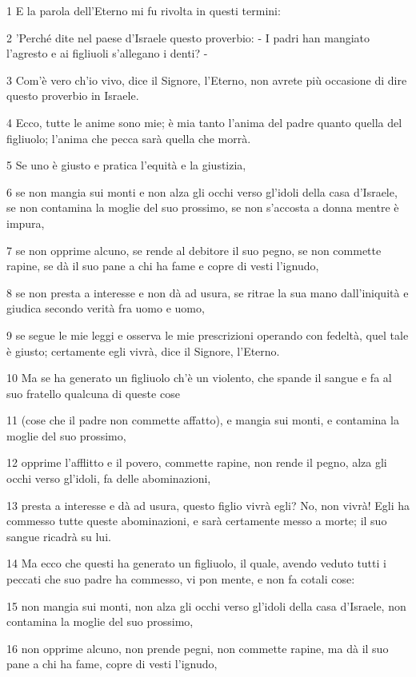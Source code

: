 \par 1 E la parola dell'Eterno mi fu rivolta in questi termini:
\par 2 'Perché dite nel paese d'Israele questo proverbio: - I padri han mangiato l'agresto e ai figliuoli s'allegano i denti? -
\par 3 Com'è vero ch'io vivo, dice il Signore, l'Eterno, non avrete più occasione di dire questo proverbio in Israele.
\par 4 Ecco, tutte le anime sono mie; è mia tanto l'anima del padre quanto quella del figliuolo; l'anima che pecca sarà quella che morrà.
\par 5 Se uno è giusto e pratica l'equità e la giustizia,
\par 6 se non mangia sui monti e non alza gli occhi verso gl'idoli della casa d'Israele, se non contamina la moglie del suo prossimo, se non s'accosta a donna mentre è impura,
\par 7 se non opprime alcuno, se rende al debitore il suo pegno, se non commette rapine, se dà il suo pane a chi ha fame e copre di vesti l'ignudo,
\par 8 se non presta a interesse e non dà ad usura, se ritrae la sua mano dall'iniquità e giudica secondo verità fra uomo e uomo,
\par 9 se segue le mie leggi e osserva le mie prescrizioni operando con fedeltà, quel tale è giusto; certamente egli vivrà, dice il Signore, l'Eterno.
\par 10 Ma se ha generato un figliuolo ch'è un violento, che spande il sangue e fa al suo fratello qualcuna di queste cose
\par 11 (cose che il padre non commette affatto), e mangia sui monti, e contamina la moglie del suo prossimo,
\par 12 opprime l'afflitto e il povero, commette rapine, non rende il pegno, alza gli occhi verso gl'idoli, fa delle abominazioni,
\par 13 presta a interesse e dà ad usura, questo figlio vivrà egli? No, non vivrà! Egli ha commesso tutte queste abominazioni, e sarà certamente messo a morte; il suo sangue ricadrà su lui.
\par 14 Ma ecco che questi ha generato un figliuolo, il quale, avendo veduto tutti i peccati che suo padre ha commesso, vi pon mente, e non fa cotali cose:
\par 15 non mangia sui monti, non alza gli occhi verso gl'idoli della casa d'Israele, non contamina la moglie del suo prossimo,
\par 16 non opprime alcuno, non prende pegni, non commette rapine, ma dà il suo pane a chi ha fame, copre di vesti l'ignudo,
